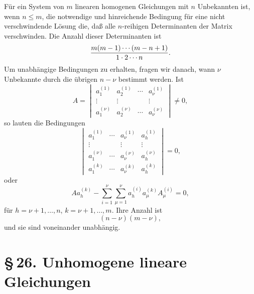 \documentclass[11pt]{article}
\begin{document}
Für ein System von \(m\) linearen homogenen Gleichungen mit \(n\) Unbekannten ist, wenn \(n\le m\), die notwendige und hinreichende Bedingung für eine nicht verschwindende Lösung die, daß alle \(n\)-reihigen Determinanten der Matrix verschwinden.  Die Anzahl dieser Determinanten ist
\[
        {m(m-1)\cdots(m-n+1)\over 1\cdot2\cdots n}.
\]
Um unabhängige Bedingungen zu erhalten, fragen wir danach, wann \(\nu\) Unbekannte durch die übrigen \(n-\nu\) bestimmt werden.  Ist
\begin{equation}
        A=\begin{vmatrix}
        a_1^{(1)}&a_2^{(1)}&\cdots&a_\nu^{(1)}\\
        \vdots&\vdots&&\vdots\\
        a_1^{(\nu)}&a_2^{(\nu)}&\cdots&a_\nu^{(\nu)}
        \end{vmatrix}\ne0,
\tag{1}
\end{equation}
so lauten die Bedingungen
\begin{equation}
\begin{vmatrix}
        a_1^{(1)}&\cdots&a_\nu^{(1)}&a_h^{(1)}\\
        \vdots&&\vdots&\vdots\\
        a_1^{(\nu)}&\cdots&a_\nu^{(\nu)}&a_h^{(\nu)}\\
        a_1^{(k)}&\cdots&a_\nu^{(k)}&a_h^{(k)}
\end{vmatrix}=0,
\tag{2}
\end{equation}
oder
\begin{equation}
        A a_h^{(k)}-\sum_{i=1}^{\nu}\sum_{\mu=1}^{\nu}
        a_h^{(i)}a_\mu^{(k)}A_\mu^{(i)}=0,
\tag{3}
\end{equation}
für \(h=\nu+1,\ldots,n\), \(k=\nu+1,\ldots,m\).  Ihre Anzahl ist
\begin{equation}
        (n-\nu)(m-\nu),
\tag{5}
\end{equation}
und sie sind voneinander unabhängig.

\section*{\S\,26. Unhomogene lineare Gleichungen}
\end{document}
